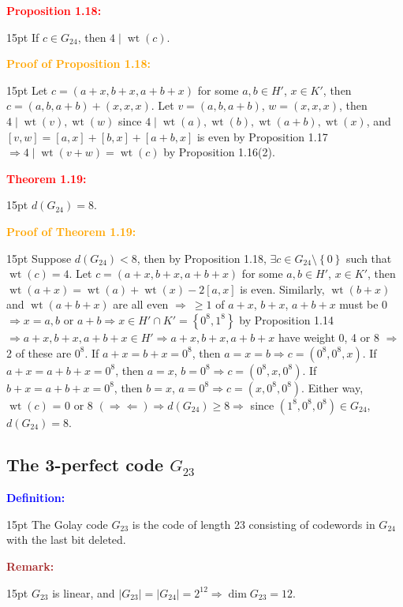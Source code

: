 \documentclass[12pt]{article}
\newcommand{\noparskip}{\vspace{-\parskip}}
\newenvironment{dent}
	{\begin{adjustwidth}{15pt}{}\noparskip}
	{\end{adjustwidth}}
\newenvironment{result}[1]
	{\textcolor{Red}{\textbf{#1:}}\begin{dent}}
	{\end{dent}}
\newenvironment{proof}[1]
	{\textcolor{Orange}{\textbf{Proof of #1:}}\begin{dent}}
	{\end{dent}}
\newenvironment{definition}
	{\textcolor{Blue}{\textbf{Definition:}}\begin{dent}}
	{\end{dent}}
\newenvironment{remark}
	{\textcolor{Brown}{\textbf{Remark:}}\begin{dent}}
	{\end{dent}}
\renewcommand{\implies}{\Rightarrow}
\newcommand{\contradiction}{\Rightarrow \Leftarrow}
\newcommand{\set}[1]{\left\{ #1 \right\}}
\newcommand{\sizeof}[1]{\left| #1 \right|}
\newcommand{\wt}[1]{\operatorname{wt}(#1)}
\begin{document}
\begin{result}{Proposition 1.18}
If $c \in G_{24}$, then $4 \mid \wt{c}$.
\end{result}

\begin{proof}{Proposition 1.18}
Let $c = (a + x, b + x, a + b + x)$ for some $a,b \in H'$, $x \in K'$, then $c = (a, b, a + b) + (x, x, x)$. Let $v = (a, b, a + b)$, $w = (x, x, x)$, then $4 \mid \wt{v}, \wt{w}$ since $4 \mid \wt{a}, \wt{b}, \wt{a + b}, \wt{x}$, and $[v, w] = [a, x] + [b, x] + [a + b, x]$ is even by Proposition 1.17 $\implies 4 \mid \wt{v + w} = \wt{c}$ by Proposition 1.16(2).
\end{proof}

\begin{result}{Theorem 1.19}
$d(G_{24}) = 8$.
\end{result}

\begin{proof}{Theorem 1.19}
Suppose $d(G_{24}) < 8$, then by Proposition 1.18, $\exists c \in G_{24} \setminus \set{0}$ such that $\wt{c} = 4$. Let $c = (a + x, b + x, a + b + x)$ for some $a,b \in H'$, $x \in K'$, then $\wt{a + x} = \wt{a} + \wt{x} - 2[a, x]$ is even. Similarly, $\wt{b + x}$ and $\wt{a + b + x}$ are all even $\implies\ \ge 1$ of $a + x$, $b + x$, $a + b + x$ must be 0 $\implies x = a, b$ or $a + b \implies x \in H' \cap K' = \set{0^8, 1^8}$ by Proposition 1.14 $\implies a + x, b + x, a + b + x \in H' \implies a + x, b + x, a + b + x$ have weight 0, 4 or 8 $\implies$ 2 of these are $0^8$. If $a + x = b + x = 0^8$, then $a = x = b \implies c = (0^8, 0^8, x)$. If $a + x = a + b + x = 0^8$, then $a = x$, $b = 0^8 \implies c = (0^8, x, 0^8)$. If $b + x = a + b + x = 0^8$, then $b = x$, $a = 0^8 \implies c = (x, 0^8, 0^8)$. Either way, $\wt{c}$ = 0 or 8 $(\contradiction) \implies d(G_{24}) \ge 8 \implies$ since $(1^8, 0^8, 0^8) \in G_{24}$, $d(G_{24}) = 8$.
\end{proof}

\subsection{The 3-perfect code $G_{23}$}

\begin{definition}
The Golay code $G_{23}$ is the code of length 23 consisting of codewords in $G_{24}$ with the last bit deleted.
\end{definition}

\begin{remark}
$G_{23}$ is linear, and $\sizeof{G_{23}} = \sizeof{G_{24}} = 2^{12} \implies \dim G_{23} = 12$.
\end{remark}
\end{document}
